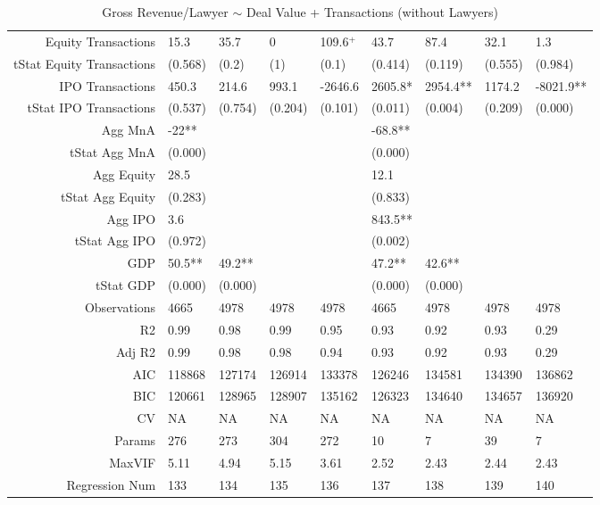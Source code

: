 \begin{table}[ht]
\begin{tabular}{rllllllll}
  Equity Transactions & 15.3 & 35.7 & 0 & 109.6$^{+}$ & 43.7 & 87.4 & 32.1 & 1.3 \\ 
  tStat Equity Transactions & (0.568) & (0.2) & (1) & (0.1) & (0.414) & (0.119) & (0.555) & (0.984) \\ 
  IPO Transactions & 450.3 & 214.6 & 993.1 & -2646.6 & 2605.8* & 2954.4** & 1174.2 & -8021.9** \\ 
  tStat IPO Transactions & (0.537) & (0.754) & (0.204) & (0.101) & (0.011) & (0.004) & (0.209) & (0.000) \\ 
  Agg MnA & -22** &  &  &  & -68.8** &  &  &  \\ 
  tStat Agg MnA & (0.000) &  &  &  & (0.000) &  &  &  \\ 
  Agg Equity & 28.5 &  &  &  & 12.1 &  &  &  \\ 
  tStat Agg Equity & (0.283) &  &  &  & (0.833) &  &  &  \\ 
  Agg IPO & 3.6 &  &  &  & 843.5** &  &  &  \\ 
  tStat Agg IPO & (0.972) &  &  &  & (0.002) &  &  &  \\ 
  GDP & 50.5** & 49.2** &  &  & 47.2** & 42.6** &  &  \\ 
  tStat GDP & (0.000) & (0.000) &  &  & (0.000) & (0.000) &  &  \\ 
  Observations & 4665 & 4978 & 4978 & 4978 & 4665 & 4978 & 4978 & 4978 \\ 
  R2 & 0.99 & 0.98 & 0.99 & 0.95 & 0.93 & 0.92 & 0.93 & 0.29 \\ 
  Adj R2 & 0.99 & 0.98 & 0.98 & 0.94 & 0.93 & 0.92 & 0.93 & 0.29 \\ 
  AIC & 118868 & 127174 & 126914 & 133378 & 126246 & 134581 & 134390 & 136862 \\ 
  BIC & 120661 & 128965 & 128907 & 135162 & 126323 & 134640 & 134657 & 136920 \\ 
  CV & NA & NA & NA & NA & NA & NA & NA & NA \\ 
  Params & 276 & 273 & 304 & 272 & 10 & 7 & 39 & 7 \\ 
  MaxVIF & 5.11 & 4.94 & 5.15 & 3.61 & 2.52 & 2.43 & 2.44 & 2.43 \\ 
  Regression Num & 133 & 134 & 135 & 136 & 137 & 138 & 139 & 140 \\ 
   \hline
\end{tabular}
\caption{Gross Revenue/Lawyer $\sim$ Deal Value + Transactions (without Lawyers)} 
\end{table}
